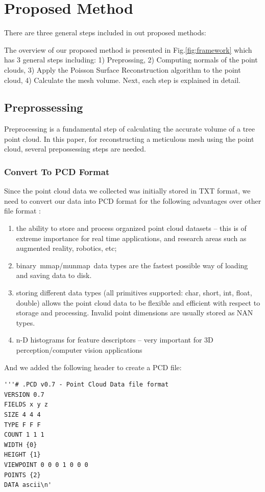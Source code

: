 \documentclass[runningheads,a4paper]{llncs}
\begin{document}
\section{Proposed Method}
There are three general steps included in out proposed methods: 

The overview of our proposed method is presented in Fig.\ref{fig:framework}  which has $3$ general steps including: 1) Preprossing, 2) Computing normals of the point clouds, 3) Apply the Poisson Surface Reconstruction algorithm to the point cloud, 4) Calculate the mesh volume. Next, each step is explained in detail. 

\subsection{Preprossessing}
Preprocessing is a fundamental step of calculating the accurate volume of a tree point cloud. In this paper, for reconstructing a meticulous mesh using the point cloud, several prepossessing steps are needed. 
\subsubsection{Convert To PCD Format}
Since the point cloud data we collected was initially stored in TXT format, we need to convert our data into PCD format for the following advantages over other file format \cite{8}:
\begin{enumerate}
\item the ability to store and process organized point cloud datasets – this is of extreme importance for real time applications, and research areas such as augmented reality, robotics, etc;
\item binary mmap/munmap data types are the fastest possible way of loading and saving data to disk.
\item storing different data types (all primitives supported: char, short, int, float, double) allows the point cloud data to be flexible and efficient with respect to storage and processing. Invalid point dimensions are usually stored as NAN types.
\item n-D histograms for feature descriptors – very important for 3D perception/computer vision applications
\end{enumerate}
And we added the following header to create a PCD file:
\begin{lstlisting}
'''# .PCD v0.7 - Point Cloud Data file format
VERSION 0.7
FIELDS x y z
SIZE 4 4 4
TYPE F F F
COUNT 1 1 1
WIDTH {0}
HEIGHT {1}
VIEWPOINT 0 0 0 1 0 0 0
POINTS {2}
DATA ascii\n'
\end{lstlisting}
\end{document}
